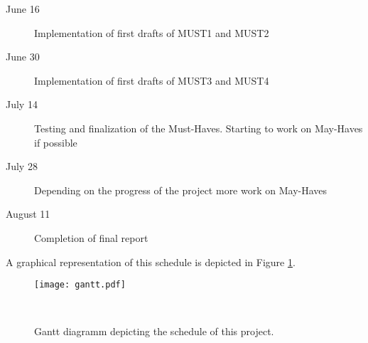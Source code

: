 \begin{description}
	\item[June 16] Implementation of first drafts of MUST1 and MUST2
	\item[June 30] Implementation of first drafts of MUST3 and MUST4
	\item[July 14] Testing and finalization of the Must-Haves. Starting to work on May-Haves if possible
	\item[July 28] Depending on the progress of the project more work on May-Haves
	\item[August 11] Completion of final report
\end{description}

A graphical representation of this schedule is depicted in Figure \ref{fig:gantt}.

\begin{figure}
  \centering
  \texttt{[image: gantt.pdf]}
  \caption{Gantt diagramm depicting the schedule of this project.}~\label{fig:gantt}
\end{figure}